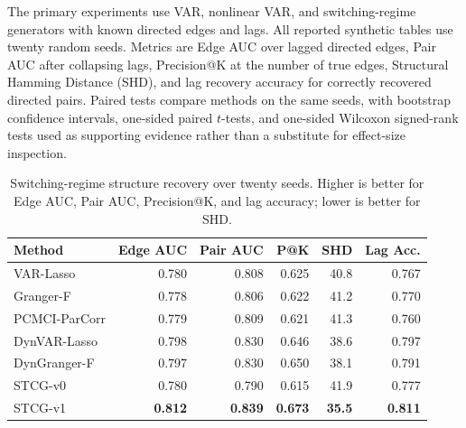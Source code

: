 \documentclass[sigconf,review,anonymous]{acmart}
\begin{document}
The primary experiments use VAR, nonlinear VAR, and switching-regime generators with known directed edges and lags.
All reported synthetic tables use twenty random seeds.
Metrics are Edge AUC over lagged directed edges, Pair AUC after collapsing lags, Precision@K at the number of true edges, Structural Hamming Distance (SHD), and lag recovery accuracy for correctly recovered directed pairs.
Paired tests compare methods on the same seeds, with bootstrap confidence intervals, one-sided paired $t$-tests, and one-sided Wilcoxon signed-rank tests used as supporting evidence rather than a substitute for effect-size inspection.

\begin{table}[t]
\caption{Switching-regime structure recovery over twenty seeds. Higher is better for Edge AUC, Pair AUC, Precision@K, and lag accuracy; lower is better for SHD.}
\label{tab:switching-recovery}
\centering
\small
\begin{tabular}{lrrrrr}
\toprule
Method & Edge AUC & Pair AUC & P@K & SHD & Lag Acc. \\
\midrule
VAR-Lasso & 0.780 & 0.808 & 0.625 & 40.8 & 0.767 \\
Granger-F & 0.778 & 0.806 & 0.622 & 41.2 & 0.770 \\
PCMCI-ParCorr & 0.779 & 0.809 & 0.621 & 41.3 & 0.760 \\
DynVAR-Lasso & 0.798 & 0.830 & 0.646 & 38.6 & 0.797 \\
DynGranger-F & 0.797 & 0.830 & 0.650 & 38.1 & 0.791 \\
STCG-v0 & 0.780 & 0.790 & 0.615 & 41.9 & 0.777 \\
STCG-v1 & \textbf{0.812} & \textbf{0.839} & \textbf{0.673} & \textbf{35.5} & \textbf{0.811} \\
\bottomrule
\end{tabular}
\end{table}
\end{document}
